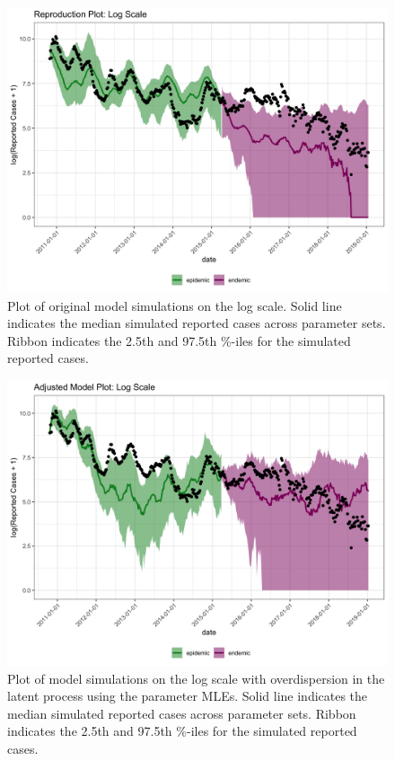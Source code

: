\documentclass[12pt]{article}
\begin{document}
\begin{figure}[H]
  \centering
  \includegraphics[width=150mm]{reprod_plot_log.png}
  \caption{Plot of original model simulations on the log scale. Solid line indicates the median simulated reported cases across parameter sets. Ribbon indicates the 2.5th and 97.5th \%-iles for the simulated reported cases.}
\end{figure}
\begin{figure}[H]
  \centering
  \includegraphics[width=150mm]{mle_plot_adj_log.png}
  \caption{Plot of model simulations on the log scale with overdispersion in the latent process using the parameter MLEs. Solid line indicates the median simulated reported cases across parameter sets. Ribbon indicates the 2.5th and 97.5th \%-iles for the simulated reported cases.}
\end{figure}
\end{document}
